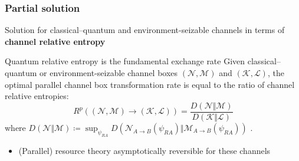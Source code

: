 \documentclass[usenames,dvipsnames,handout]{beamer}
\begin{document}
\begin{frame}
\frametitle{Partial solution}

\pause
Solution for classical--quantum and environment-seizable \cite{BHKW18} channels in terms of {\color{MidnightBlue}\textbf{channel relative entropy}} \cite{Cooney2016,LKDW18}

\pause
\begin{block}{Quantum relative entropy is the fundamental exchange rate}
Given classical--quantum or environment-seizable channel boxes $(\mathcal{N},\mathcal{M})$ and $(\mathcal{K},\mathcal{L})$, the optimal parallel channel box transformation rate is equal to the ratio of channel relative entropies:
$$
R^p((\mathcal{N},\mathcal{M})\rightarrow(\mathcal{K},\mathcal{L})) = \frac{D(\mathcal{N}\Vert\mathcal{M})}{D(\mathcal{K}\Vert\mathcal{L}
)}
$$
where $D(\mathcal{N} \Vert \mathcal{M}) \coloneqq  \sup_{\psi_{RA}} D(\mathcal{N}_{A \to B} (\psi_{RA}) \Vert \mathcal{M}_{A\to B}(\psi_{RA}))$ \cite{Cooney2016,LKDW18}.

\end{block}

\begin{itemize}


\pause

\vspace{.1in}
\item (Parallel) resource theory asymptotically reversible for these channels

\end{itemize}


\end{frame}
\end{document}

